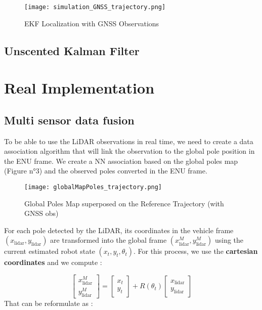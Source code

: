 \documentclass[conference]{IEEEtran}
\begin{document}
\begin{figure}[H]
    \centering
    \texttt{[image: simulation\_GNSS\_trajectory.png]}
    \caption{EKF Localization with GNSS Observations}
    \label{fig:enter-label}
\end{figure}




\subsection{Unscented Kalman Filter}

\newpage

\section{Real Implementation}

\subsection{Multi sensor data fusion}

To be able to use the LiDAR observations in real time, we need to create a data association algorithm that will link the observation to the global pole position in the ENU frame. We create a NN association based on the global poles map (Figure n°3) and the observed poles converted in the ENU frame.   

\begin{figure}[H]
    \centering
    \texttt{[image: globalMapPoles\_trajectory.png]}
    \caption{Global Poles Map superposed on the Reference Trajectory (with GNSS obs)}
    \label{fig:enter-label}
\end{figure}

For each pole detected by the LiDAR, its coordinates in the vehicle frame \((x_{\text{lidar}}, y_{\text{lidar}})\) are transformed into the global frame \((x_{\text{lidar}}^{M}, y_{\text{lidar}}^{M})\) using the current estimated robot state \((x_t, y_t, \theta_t)\). For this process, we use the \textbf{cartesian coordinates} and we compute :

\[
\begin{bmatrix}
x_{\text{lidar}}^{M} \\
y_{\text{lidar}}^{M}
\end{bmatrix}
=
\begin{bmatrix}
x_t \\
y_t
\end{bmatrix} 
+
R(\theta_t)
\begin{bmatrix}
x_{\text{lidar}} \\
y_{\text{lidar}}
\end{bmatrix}
\]
\noindent That can be reformulate as :
\end{document}
